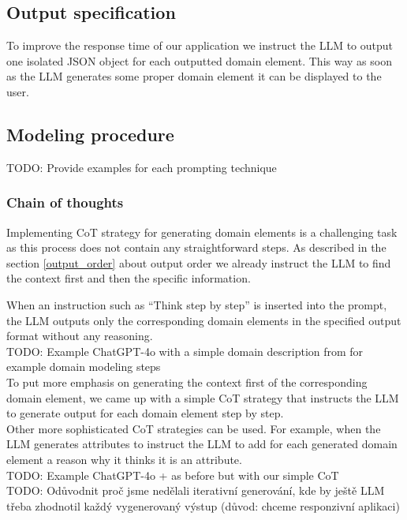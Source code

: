 \subsection{Output specification}
To improve the response time of our application we instruct the LLM to output one isolated JSON object for each outputted domain element. This way as soon as the LLM generates some proper domain element it can be displayed to the user.


\subsection{Modeling procedure}

TODO: Provide examples for each prompting technique


\subsubsection{Chain of thoughts}

Implementing CoT strategy for generating domain elements is a challenging task as this process does not contain any straightforward steps. As described in the section \ref{output_order} about output order we already instruct the LLM to find the context first and then the specific information.

When an instruction such as ``Think step by step'' is inserted into the prompt, the LLM outputs only the corresponding domain elements in the specified output format without any reasoning. \\

TODO: Example ChatGPT-4o with a simple domain description from for example domain modeling steps \\

To put more emphasis on generating the context first of the corresponding domain element, we came up with a simple CoT strategy that instructs the LLM to generate output for each domain element step by step. \\

Other more sophisticated CoT strategies can be used. For example, when the LLM generates attributes to instruct the LLM to add for each generated domain element a reason why it thinks it is an attribute. \\

TODO: Example ChatGPT-4o + as before but with our simple CoT \\


TODO: Odůvodnit proč jsme nedělali iterativní generování, kde by ještě LLM třeba zhodnotil každý vygenerovaný výstup (důvod: chceme responzivní aplikaci)


